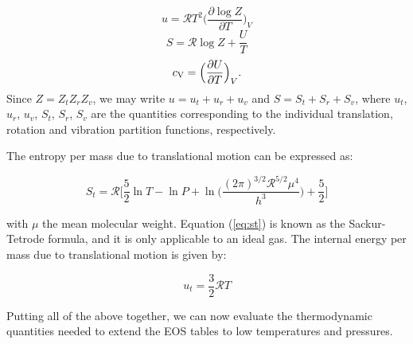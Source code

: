 \documentclass[apj]{emulateapj}
\begin{document}
%
%

\begin{equation}
\label{eq:u}
u=\mathcal{R} T^2 \Big(\frac{\partial \log{Z}}{\partial T}\Big)_{V}
\end{equation}
\begin{equation}
\label{eq:s}
S=\mathcal{R} \log{Z} + \frac{U}{T}
\end{equation}
\begin{equation}
\label{eq:cv}
c_{\rm V}=\Big(\frac{\partial U}{\partial T}\Big)_{V}.
\end{equation}
Since $Z=Z_t Z_r Z_v$, we may write $u=u_t+u_r+u_v$ and $S=S_t+S_r+S_v$, where $u_t$, $u_r$, $u_v$, $S_t$, $S_r$, $S_v$ are the quantities corresponding to the individual translation, rotation and vibration partition functions, respectively.

The entropy per mass due to translational motion can be expressed as:

\begin{equation}
\label{eq:st}
S_t=\mathcal{R} \Big[ \frac{5}{2} \ln{T} - \ln{P} + \ln \Big( \frac{(2 \pi)^{3/2} \mathcal{R}^{5/2} \mu^4}{h^3}\Big) +\frac{5}{2} \Big]
\end{equation}

\noindent with $\mu$ the mean molecular weight. Equation (\ref{eq:st}) is known as the Sackur-Tetrode formula, and it is only applicable to an ideal gas. The internal energy per mass due to translational motion is given by:

\begin{equation}
\label{eq:ut}
u_t=\frac{3}{2} \mathcal{R} T
\end{equation}

Putting all of the above together, we can now evaluate the thermodynamic quantities needed to extend the \cite{saumon95} EOS tables to low temperatures and pressures.
\end{document}
